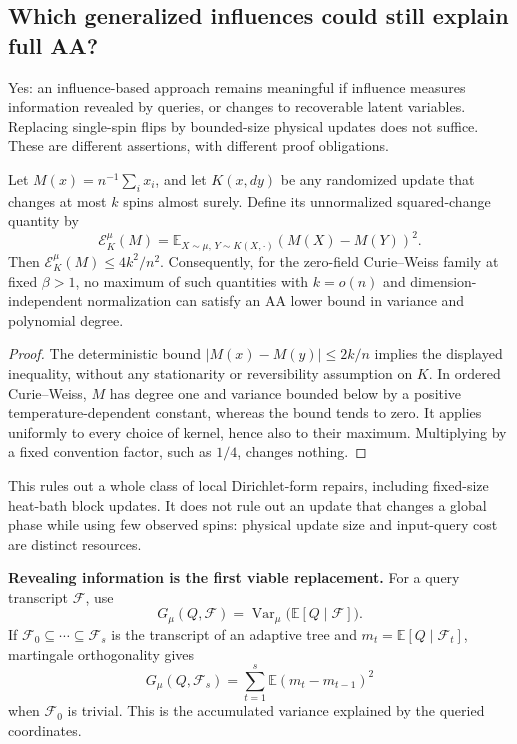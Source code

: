 \subsection{Which generalized influences could still explain full AA?}
\label{tht:generalized-influence}

Yes: an influence-based approach remains meaningful if influence
measures information revealed by queries, or changes to recoverable
latent variables. Replacing single-spin flips by bounded-size physical
updates does not suffice. These are different assertions, with different
proof obligations.

\begin{proposition}
\label{tht:local-update-obstruction}
Let \(M(x)=n^{-1}\sum_i x_i\), and let \(K(x,dy)\) be any randomized
update that changes at most \(k\) spins almost surely. Define its
unnormalized squared-change quantity by
\[
 \mathcal E_K^\mu(M)=
 \mathbb E_{X\sim\mu,\,Y\sim K(X,\cdot)}(M(X)-M(Y))^2.
\]
Then \(\mathcal E_K^\mu(M)\le4k^2/n^2\). Consequently, for the
zero-field Curie--Weiss family at fixed \(\beta>1\), no maximum of
such quantities with \(k=o(n)\) and dimension-independent normalization
can satisfy an AA lower bound in variance and polynomial degree.
\end{proposition}

\begin{proof}
The deterministic bound \(|M(x)-M(y)|\le2k/n\) implies the displayed
inequality, without any stationarity or reversibility assumption on
\(K\). In ordered Curie--Weiss, \(M\) has degree one and variance
bounded below by a positive temperature-dependent constant, whereas
the bound tends to zero. It applies uniformly to every choice of
kernel, hence also to their maximum. Multiplying by a fixed convention
factor, such as \(1/4\), changes nothing.
\end{proof}

This rules out a whole class of local Dirichlet-form repairs, including
fixed-size heat-bath block updates. It does not rule out an update that
changes a global phase while using few observed spins: physical update
size and input-query cost are distinct resources.

\textbf{Revealing information is the first viable replacement.}
For a query transcript \(\mathcal F\), use
\[
 G_\mu(Q,\mathcal F)
 =\operatorname{Var}_\mu\bigl(\mathbb E[Q\mid\mathcal F]\bigr).
\]
If \(\mathcal F_0\subseteq\cdots\subseteq\mathcal F_s\) is the
transcript of an adaptive tree and
\(m_t=\mathbb E[Q\mid\mathcal F_t]\), martingale orthogonality gives
\[
 G_\mu(Q,\mathcal F_s)=
 \sum_{t=1}^s\mathbb E(m_t-m_{t-1})^2
\]
when \(\mathcal F_0\) is trivial. This is the accumulated variance
explained by the queried coordinates.


